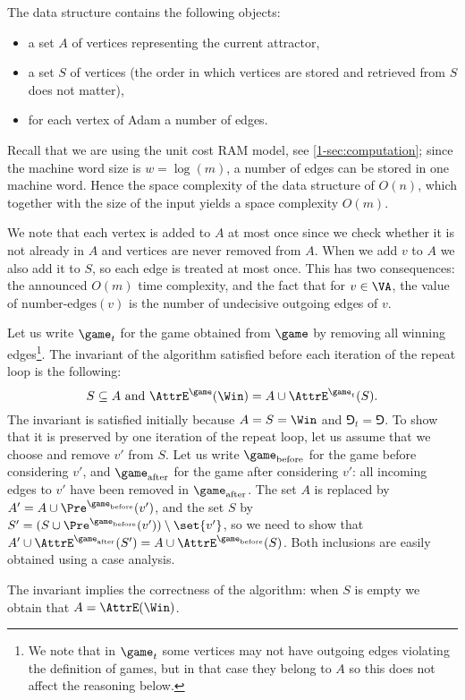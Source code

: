 The data structure contains the following objects:
\begin{itemize}
	\item a set $A$ of vertices representing the current attractor,
	\item a set $S$ of vertices (the order in which vertices are stored and retrieved from $S$ does not matter),
	\item for each vertex of Adam a number of edges.
\end{itemize}
Recall that we are using the unit cost RAM model, see \cref{1-sec:computation}; 
since the machine word size is $w = \log(m)$, a number of edges can be stored in one machine word.
Hence the space complexity of the data structure of $O(n)$,
which together with the size of the input yields a space complexity $O(m)$.

We note that each vertex is added to $A$ at most once since we check whether it is not already in $A$ and vertices are never removed from $A$.
When we add $v$ to $A$ we also add it to $S$, so each edge is treated at most once. 
This has two consequences: the announced $O(m)$ time complexity, and the fact that for $v \in \VA$,
the value of $\text{number}$-$\text{edges}(v)$ is the number of undecisive outgoing edges of $v$.

Let us write $\game_t$ for the game obtained from $\game$ by removing all winning edges\footnote{We note that in $\game_t$ some vertices may not have outgoing edges violating the definition of games, but in that case they belong to $A$
so this does not affect the reasoning below.}.
The invariant of the algorithm satisfied before each iteration of the repeat loop is the following:
\[
S \subseteq A \text{ and } \AttrE^\game(\Win) = A \cup \AttrE^{\game_t}(S).
\]
The invariant is satisfied initially because $A = S = \Win$ and $\Game_t = \Game$.
To show that it is preserved by one iteration of the repeat loop, let us assume that we choose and remove $v'$ from $S$.
Let us write $\game_{\text{before}}$ for the game before considering $v'$, and $\game_{\text{after}}$ for the game after considering $v'$:
all incoming edges to $v'$ have been removed in $\game_{\text{after}}$.
The set $A$ is replaced by $A' = A \cup \Pre^{\game_{\text{before}}}(v')$, and the set $S$ by 
$S' = (S \cup \Pre^{\game_{\text{before}}}(v')) \setminus \set{v'}$,
so we need to show that $A' \cup \AttrE^{\game_{\text{after}}}(S') = A \cup \AttrE^{\game_{\text{before}}}(S)$.
Both inclusions are easily obtained using a case analysis.

The invariant implies the correctness of the algorithm: when $S$ is empty we obtain that $A = \AttrE(\Win)$.

